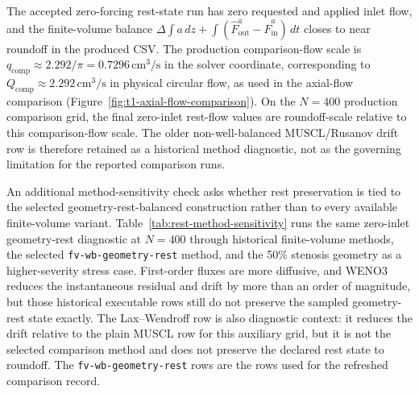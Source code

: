 
The accepted zero-forcing rest-state run has zero requested and applied inlet
flow, and the finite-volume balance
$\Delta\!\int a\,dz+\int(\widehat F^a_{\mathrm{out}}-\widehat F^a_{\mathrm{in}})\,dt$
closes to near roundoff in the produced CSV. The production comparison-flow
scale is
$q_{\mathrm{comp}}\approx2.292/\pi=0.7296\,\mathrm{cm}^3/\mathrm{s}$ in the
solver coordinate, corresponding to
$Q_{\mathrm{comp}}\approx2.292\,\mathrm{cm}^3/\mathrm{s}$ in physical circular
flow, as used in the axial-flow comparison
(Figure~\ref{fig:t1-axial-flow-comparison}). On the $N=400$ production
comparison grid, the final zero-inlet rest-flow values are roundoff-scale
relative to this comparison-flow scale. The older non-well-balanced
MUSCL/Rusanov drift row is therefore retained as a historical method diagnostic,
not as the governing limitation for the reported comparison runs.

An additional method-sensitivity check asks whether rest preservation is tied to
the selected geometry-rest-balanced construction rather than to every available
finite-volume variant. Table~\ref{tab:rest-method-sensitivity} runs the same
zero-inlet geometry-rest diagnostic at $N=400$ through historical
finite-volume methods, the selected \texttt{fv-wb-geometry-rest} method, and the
50\% stenosis geometry as a higher-severity stress case. First-order fluxes are
more diffusive, and WENO3 reduces the instantaneous residual and drift by more
than an order of magnitude, but those historical executable rows still do not
preserve the sampled geometry-rest state exactly. The Lax--Wendroff row is also
diagnostic context: it reduces the drift relative to the plain MUSCL row for
this auxiliary grid, but it is not the selected comparison method and does not
preserve the declared rest state to roundoff. The
\texttt{fv-wb-geometry-rest} rows are the rows used for the refreshed
comparison record.

